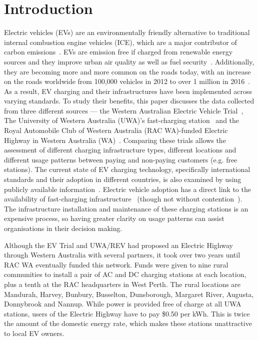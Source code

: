 \section{Introduction}
\label{sec:10:intro}
Electric vehicles (EVs) are an environmentally friendly alternative to traditional internal combustion engine vehicles (ICE), which are a major contributor of carbon emissions~\cite{department_of_infrastructure_and_regional_development_vehicle_2016}. EVs are emission free if charged from renewable energy sources and they improve urban air quality as well as fuel security~\cite{climateworks_australia_path_2016}. Additionally, they are becoming more and more common on the roads today, with an increase on the roads worldwide from 100,000 vehicles in 2012 to over 1 million in 2016~\cite{statista_worldwide_nodate}. As a result, EV charging and their infrastructures have been implemented across varying standards. To study their benefits, this paper discusses the data collected from three different sources --- the Western Australian Electric Vehicle Trial~\cite{mader_western_2013}, The University of Western Australia (UWA)'s fast-charging station~\cite{noauthor_electric_2017} and the Royal Automobile Club of Western Australia (RAC WA)-funded Electric Highway in Western Australia (WA)~\cite{rac_wa_rac_nodate}. Comparing these trials allows the assessment of different charging infrastructure types, different locations and different usage patterns between paying and non-paying customers (e.g. free stations). The current state of EV charging technology,  specifically international standards and their adoption in different countries, is also examined by using publicly available information~\cite{plugshare_plugshare_nodate}. Electric vehicle adoption has a direct link to the availability of fast-charging infrastructure~\cite{gebauer_changing_2016} (though not without contention~\cite{bailey_is_2015}). The infrastructure installation and maintenance of these charging stations is an expensive process, so having greater clarity on usage patterns can assist organisations in their decision making.


Although the EV Trial and UWA/REV had proposed an Electric Highway through Western Australia with several partners, it took over two years until RAC WA eventually funded this network. Funds were given to nine rural communities to install a pair of AC and DC charging stations at each location, plus a tenth at the RAC headquarters in West Perth. The rural locations are Mandurah, Harvey, Bunbury, Busselton, Dunsborough, Margaret River, Augusta, Donnybrook and Nannup. While power is provided free of charge at all UWA stations, users of the Electric Highway have to pay \$0.50 per kWh. This is twice the amount of the domestic energy rate, which makes these stations unattractive to local EV owners.

